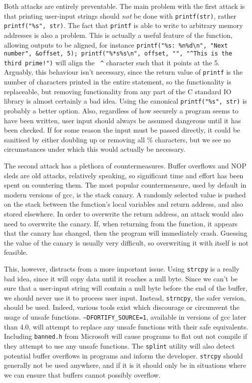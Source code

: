 Both attacks are entirely preventable. The main problem with the first attack is that printing user-input strings should
\emph{not} be done with {\tt printf(str)}, rather {\tt printf("\%s", str)}. The fact that {\tt printf} is able to write
to arbitrary memory addresses is also a problem. This is actually a useful feature of the function, allowing outputs to
be aligned, for instance {\tt printf("\%s: \%n\%d\textbackslash n", "Next number", \&offset, 5);
printf("\%*s\%s\textbackslash n", offset, "", "\textasciicircum This is the third prime!")} will align the {\tt
\textasciicircum} character such that it points at the 5. Arguably, this behaviour isn't necessary, since the return
value of {\tt printf} is the number of characters printed in the entire statement, so the functionality is replaceable,
but removing functionality from any part of the C standard IO library is almost certainly a bad idea. Using the
canonical {\tt printf("\%s", str)} is probably a better option. Also, regardless of how securely a program seems to have
been written, user input should always be assumed dangerous until it has been checked. If for some reason the input must
be passed directly, it could be sanitised by either doubling up or removing all \% characters, but we see no
circumstances under which this would actually be necessary.

The second attack has a plethora of countermeasures. Buffer overflows and NOP sleds are old attacks, relatively speaking, so
significant time and effort has been spent on countering them. The most popular countermeasure, used by default in
modern versions of gcc, is the stack canary. A randomly selected value is pushed on the stack between the function's
local variables and return address, and also stored elsewhere. In order to overwrite the return address, an attack would
also need to overwrite the canary. If, when returning from the function, it appears that the canary has changed, then
the program will immediately crash. Guessing the value of the canary is usually very difficult, so overwriting it with
itself is not feasible.

This, however, distracts from a more important issue. Using {\tt strcpy} is a really bad idea, since it will copy data
until it reaches a null byte. Since we can't be sure that a user-input string will contain a null byte before the end of
the buffer, we should never use it to process user input. Instead, {\tt strncpy}, the safer version, should be used.
Indeed, various tools exist which discourage or circumvent the usage of unsafe functions.
{\tt --DFORTIFY\_SOURCE=1}, available in versions of gcc later than 4.0, will attempt to replace any unsafe functions
with their safe equivalents. Including {\tt banned.h} from Microsoft
will cause programs to flat out not compile if they attempt to use any unsafe functions. The {\tt splint} utility will
also detect potential buffer overflows in programs and inform the developer. {\tt strcpy} should generally not be used
anywhere, and if it is it should only be in situations where we can ensure that buffers cannot possibly overflow.

